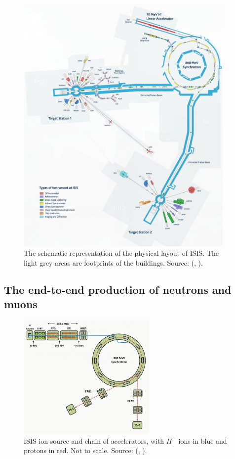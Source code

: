 \documentclass[10pt,oneside]{report}
\renewcommand{\citet}[1]{\citeauthor{#1}, \citeyear{#1}}
\begin{document}
\begin{figure}[htbp]
    \centering
    \includegraphics[width=0.95\textwidth]{ISIS.png}
    \caption{The schematic representation of the physical layout of ISIS. The light grey areas are footprints of the buildings. Source: (\citet{thomason2019isis}).}\label{fig:isis}
\end{figure}

\subsection{The end-to-end production of neutrons and muons}
\begin{figure}[htbp]
    \centering
    \includegraphics[width=0.6\textwidth]{ISIS2.png}
    \caption{ISIS ion source and chain of accelerators, with $H^-$ ions in blue and protons in red. Not to scale. Source: (\citet{2021practicalguide}).}\label{fig:isis2}
\end{figure}
\end{document}
